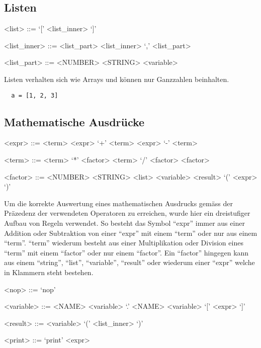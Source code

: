 \subsection{Listen}
\label{sub:listen}
\begin{grammar}
<list> ::= `[' <list_inner> `]'
\end{grammar}
\begin{grammar}
<list\_inner> ::= <list\_part>
\alt <list\_inner> `,' <list\_part>
\end{grammar}
\begin{grammar}
<list\_part> ::= <NUMBER>
\alt <STRING>
\alt <variable>
\end{grammar}

Listen verhalten sich wie Arrays und können nur Ganzzahlen beinhalten.

\begin{lstlisting}
  a = [1, 2, 3]
\end{lstlisting}

\subsection{Mathematische Ausdrücke}
\label{sub:mathematische_ausdrücke}

\begin{grammar}
<expr> ::= <term>
\alt <expr> `+' <term>
\alt <expr> `-' <term>
\end{grammar}

\begin{grammar}
<term> ::= <term> `*' <factor>
\alt <term> `/' <factor>
\alt <factor>
\end{grammar}

\begin{grammar}
<factor> ::= <NUMBER>
\alt <STRING>
\alt <list>
\alt <variable>
\alt <result>
\alt `(' <expr> `)'
\end{grammar}

Um die korrekte Auswertung eines mathematischen Ausdrucks gemäss der Präzedenz der verwendeten Operatoren zu erreichen, wurde hier ein dreistufiger Aufbau von Regeln verwendet. So besteht das Symbol ``expr'' immer aus einer Addition oder Subtraktion von einer ``expr'' mit einem ``term'' oder nur aus einem ``term''. ``term'' wiederum besteht aus einer Multiplikation oder Division eines ``term'' mit einem ``factor'' oder nur einem ``factor''. Ein ``factor'' hingegen kann aus einem ``string'', ``list'', ``variable'', ``result'' oder wiederum einer ``expr'' welche in Klammern steht bestehen.

\begin{grammar}
<nop> ::= `nop'
\end{grammar}

\begin{grammar}
<variable> ::= <NAME>
\alt <variable> `.' <NAME>
\alt <variable> `[' <expr> `]'
\end{grammar}

\begin{grammar}
<result> ::= <variable> `(' <list\_inner> `)'
\end{grammar}

\begin{grammar}
<print> ::= `print' <expr>
\end{grammar}